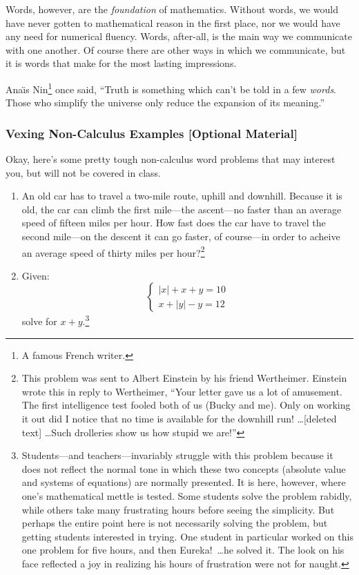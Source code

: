 \documentclass[12pt,addpoints, answers, fleqn]{exam}
\begin{document}
Words, however, are the \emph{foundation} of mathematics. Without words, we would have never gotten to mathematical reason in the first place, nor we would have any need for numerical fluency. Words, after-all, is the main way we communicate with one another. Of course there are other ways in which we communicate, but it is words that make for the most lasting impressions.



Ana\"{\i}s Nin\footnote{A famous French writer.} once said, ``Truth is something which can't be told in a few \emph{words}. Those who simplify the universe only reduce the expansion of its meaning.''

\subsubsection{Vexing Non-Calculus Examples [Optional Material]}

Okay, here's some pretty tough non-calculus word problems that may interest you, but will not be covered in class.
\begin{enumerate}
\item An old car has to travel a two-mile route, uphill and downhill. Because it is old, the car can climb the first mile---the ascent---no faster than an average speed of fifteen miles per hour. How fast does the car have to travel the second mile---on the descent it can go faster, of course---in order to acheive an average speed of thirty miles per hour?\footnote{This problem was sent to Albert Einstein by his friend Wertheimer. Einstein wrote this in reply to Wertheimer, ``Your letter gave us a lot of amusement. The first intelligence test fooled both of us (Bucky and me). Only on working it out did I notice that no time is available for the downhill run! \ldots [deleted text] \ldots Such drolleries show us how stupid we are!''}



\item Given:
\[
\left\{ {\begin{array}{c}
   {\left| x \right| + x + y = 10}\\
   {x + \left| y \right| - y = 12}
\end{array}} \right.
\]
solve for $x + y$.\footnote{Students---and teachers---invariably struggle with this problem because it does not reflect the normal tone in which these two concepts (absolute value and systems of equations) are normally presented. It is here, however, where one's mathematical mettle is tested. Some students solve the problem rabidly, while others take many frustrating hours before seeing the simplicity. But perhaps the entire point here is not necessarily solving the problem, but getting students interested in trying. One student in particular worked on this one problem for five hours, and then Eureka!\ \ldots he solved it. The look on his face reflected a joy in realizing his hours of frustration were not for naught.}



\end{enumerate}
\end{document}
